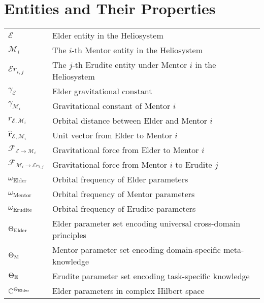 \section*{Entities and Their Properties}
\vspace{-0.5em}
\begin{tabular}{p{3cm} p{12cm}}
$\mathcal{E}$ & Elder entity in the Heliosystem \\
$\mathcal{M}_i$ & The $i$-th Mentor entity in the Heliosystem \\
$\mathcal{E}r_{i,j}$ & The $j$-th Erudite entity under Mentor $i$ in the Heliosystem \\
$\gamma_{\mathcal{E}}$ & Elder gravitational constant \\
$\gamma_{\mathcal{M}_i}$ & Gravitational constant of Mentor $i$ \\
$r_{\mathcal{E},\mathcal{M}_i}$ & Orbital distance between Elder and Mentor $i$ \\
$\mathbf{\hat{r}}_{\mathcal{E},\mathcal{M}_i}$ & Unit vector from Elder to Mentor $i$ \\
$\mathcal{F}_{\mathcal{E} \rightarrow \mathcal{M}_i}$ & Gravitational force from Elder to Mentor $i$ \\
$\mathcal{F}_{\mathcal{M}_i \rightarrow \mathcal{E}r_{i,j}}$ & Gravitational force from Mentor $i$ to Erudite $j$ \\
$\omega_{\text{Elder}}$ & Orbital frequency of Elder parameters \\
$\omega_{\text{Mentor}}$ & Orbital frequency of Mentor parameters \\
$\omega_{\text{Erudite}}$ & Orbital frequency of Erudite parameters \\
$\Theta_{\text{Elder}}$ & Elder parameter set encoding universal cross-domain principles \\
$\Theta_{\text{M}}$ & Mentor parameter set encoding domain-specific meta-knowledge \\
$\Theta_{\text{E}}$ & Erudite parameter set encoding task-specific knowledge \\
$\mathbb{C}^{\Theta_{\text{Elder}}}$ & Elder parameters in complex Hilbert space \\
\end{tabular}

\newpage
